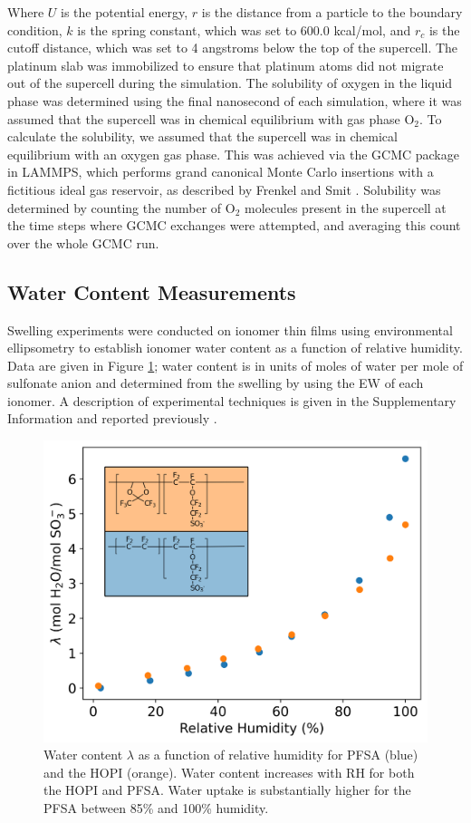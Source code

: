\documentclass[journal=jacsat,manuscript=article]{achemso}
\begin{document}
Where $U$ is the potential energy, $r$ is the distance from a particle to the boundary condition, $k$ is the spring constant, which was set to 600.0 kcal/mol, and $r_c$ is the cutoff distance, which was set to 4 angstroms below the top of the supercell. The platinum slab was immobilized to ensure that platinum atoms did not migrate out of the supercell during the simulation. The solubility of oxygen in the liquid phase was determined using the final nanosecond of each simulation, where it was assumed that the supercell was in chemical equilibrium with gas phase O$_2$. To calculate the solubility, we assumed that the supercell was in chemical equilibrium with an oxygen gas phase. This was achieved via the GCMC package in LAMMPS, which performs grand canonical Monte Carlo insertions with a fictitious ideal gas reservoir, as described by Frenkel and Smit \cite{frenkel_understanding_2002}. Solubility was determined by counting the number of O$_2$ molecules present in the supercell at the time steps where GCMC exchanges were attempted, and averaging this count over the whole GCMC run.

\subsection{Water Content Measurements}
Swelling experiments were conducted on ionomer thin films using environmental ellipsometry to establish ionomer water content as a function of relative humidity. Data are given in Figure \ref{fig:water-number}; water content is in units of moles of water per mole of sulfonate anion and determined from the swelling by using the EW of each ionomer. A description of experimental techniques is given in the Supplementary Information and reported previously \cite{bird_modulating_nodate}. 

\begin{figure}
    \centering
    \includegraphics[width=0.9\linewidth]{humidity.png}
    \caption{Water content $\lambda$ as a function of relative humidity for PFSA (blue) and the HOPI (orange). Water content increases with RH for both the HOPI and PFSA. Water uptake is substantially higher for the PFSA between 85\% and 100\% humidity.} 
    \label{fig:water-number}
\end{figure}
\end{document}
